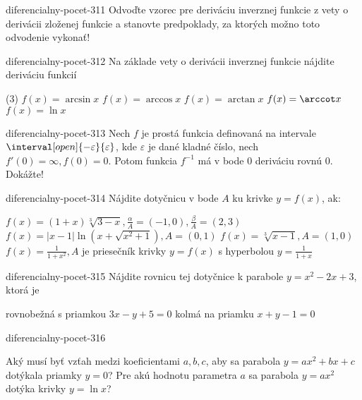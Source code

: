 \begin{defproblem}{diferencialny-pocet-311}
Odvoďte vzorec pre deriváciu inverznej funkcie z vety o derivácii zloženej
funkcie a stanovte predpoklady, za ktorých možno toto odvodenie vykonať!
\end{defproblem}

\begin{defproblem}{diferencialny-pocet-312}
Na základe vety o derivácii inverznej funkcie nájdite deriváciu funkcií
\begin{tasks}(3)
  \task $f(x)=\arcsin x$
  \task $f(x)=\arccos x$
  \task $f(x)=\arctan x$
  \task $f(x)=\arccot x$
  \task $f(x)=\ln x$
\end{tasks}
\end{defproblem}

\begin{defproblem}{diferencialny-pocet-313}
Nech $f$ je prostá funkcia definovaná na intervale
$\interval[open]{-\varepsilon}{\varepsilon}$, kde $\varepsilon$ je dané kladné
číslo, nech $f'(0)=\infty,f(0)=0$. Potom funkcia $f^{-1}$ má v bode $0$
deriváciu rovnú $0$. Dokážte!
\end{defproblem}

\begin{defproblem}{diferencialny-pocet-314}
Nájdite dotyčnicu v bode $A$ ku krivke $y=f(x)$, ak:
\begin{tasks}
\task
  $f(x)=(1+x)\sqrt[3]{3-x},\frac{\alpha}{A}=(-1,0),\frac{\beta}{A}=(2,3)$
\task
  $f(x)=|x-1|\ln (x+\sqrt{x^2+1}),A=(0,1)$
\task
  $f(x)=\sqrt[3]{x-1},A=(1,0)$
\task
  $f(x)=\frac{1}{1+x^2},A$ je priesečník krivky $y=f(x)$ s hyperbolou
  $y=\frac{1}{1+x}$
\end{tasks}
\end{defproblem}

\begin{defproblem}{diferencialny-pocet-315}
Nájdite rovnicu tej dotyčnice k parabole $y=x^2-2x+3$, ktorá je
\begin{tasks}
\task rovnobežná s priamkou $3x-y+5=0$
\task kolmá na priamku $x+y-1=0$
\end{tasks}
\end{defproblem}

\begin{defproblem}{diferencialny-pocet-316}
\begin{tasks}
\task
  Aký musí byť vzťah medzi koeficientami $a,b,c$, aby sa parabola $y=ax^2+bx+c$
  dotýkala priamky $y=0$?
\task
  Pre akú hodnotu parametra $a$ sa parabola $y=ax^2$ dotýka krivky $y=\ln x$?
\end{tasks}
\end{defproblem}

